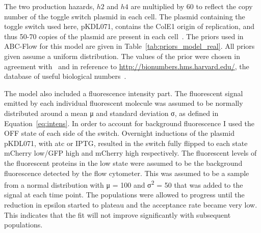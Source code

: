 The two production hazards, $h2$ and $h4$ are multiplied by 60 to reflect the copy number of the toggle switch plasmid in each cell. The plasmid containing the toggle switch used here, pKDL071, contains the ColE1 origin of replication, and thus 50-70 copies of the plasmid are present in each cell~\autocite{Milo:2010cz}. The priors used in ABC-Flow for this model are given in Table~\ref{tab:priors_model_real}. All priors given assume a uniform distribution. The values of the prior were chosen in agreement with~\autocite{Lillacci:2013hu} and in reference to \url{http://bionumbers.hms.harvard.edu/}, the database of useful biological numbers~\autocite{Milo:2010cz}. 

The model also included a fluorescence intensity part. The fluorescent signal emitted by each individual fluorescent molecule was assumed to be normally distributed around a mean μ and standard deviation σ, as defined in Equation~\ref{eq:intens}. In order to account for background fluorescence I used the OFF state of each side of the switch. Overnight inductions of the plasmid pKDL071, with \acrshort{atc} or IPTG, resulted in the switch fully flipped to each state mCherry low/GFP high and mCherry high respectively. The fluorescent levels of the fluorescent proteins in the low state were assumed to be the background fluorescence detected by the flow cytometer. This was assumed to be a sample from a normal distribution with μ = 100 and σ\textsuperscript{2} = 50 that was added to the signal at each time point. The populations were allowed to progress until the reduction in epsilon started to plateau and the acceptance rate became very low. This indicates that the fit will not improve significantly with subsequent populations.




